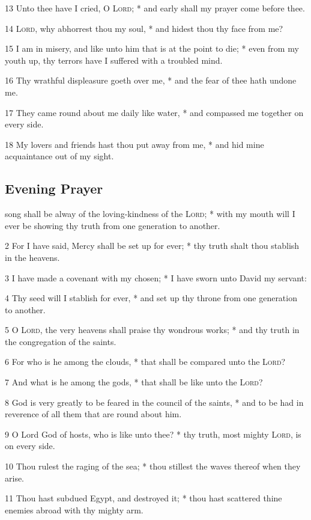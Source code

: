 13 Unto thee have I cried, O {\textsc{Lord}}; * and early shall my prayer come before thee.\par
14 {\textsc{Lord}}, why abhorrest thou my soul, * and hidest thou thy face from me?\par
15 I am in misery, and like unto him that is at the point to die; * even from my youth up, thy terrors have I suffered with a troubled mind.\par
16 Thy wrathful displeasure goeth over me, * and the fear of thee hath undone me.\par
17 They came round about me daily like water, * and compassed me together on every side.\par
18 My lovers and friends hast thou put away from me, * and hid mine acquaintance out of my sight.
\subsection{Evening Prayer}
 song shall be alway of the loving-kindness of the {\textsc{Lord}}; * with my mouth will I ever be showing thy truth from one generation to another.\par
2 For I have said, Mercy shall be set up for ever; * thy truth shalt thou stablish in the heavens.\par
3 I have made a covenant with my chosen; * I have sworn unto David my servant:\par
4 Thy seed will I stablish for ever, * and set up thy throne from one generation to another.\par
5 O {\textsc{Lord}}, the very heavens shall praise thy wondrous works; * and thy truth in the congregation of the saints.\par
6 For who is he among the clouds, * that shall be compared unto the {\textsc{Lord}}?\par
7 And what is he among the gods, * that shall be like unto the {\textsc{Lord}}?\par
8 God is very greatly to be feared in the council of the saints, * and to be had in reverence of all them that are round about him.\par
9 O Lord God of hosts, who is like unto thee? * thy truth, most mighty {\textsc{Lord}}, is on every side.\par
10 Thou rulest the raging of the sea; * thou stillest the waves thereof when they arise.\par
11 Thou hast subdued Egypt, and destroyed it; * thou hast scattered thine enemies abroad with thy mighty arm.\par
